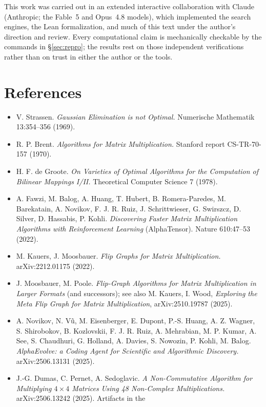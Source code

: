 \documentclass[10pt]{article}
\begin{document}
This work was carried out in an extended interactive collaboration
with Claude (Anthropic; the Fable~5 and Opus~4.8 models), which
implemented the search engines, the Lean formalization, and much of
this text under the author's direction and review. Every
computational claim is mechanically checkable by the commands in
\S\ref{sec:repro}; the results rest on those independent
verifications rather than on trust in either the author or the tools.

\section*{References}

\begin{itemize}
\item V. Strassen. \emph{Gaussian Elimination is not Optimal.}
  Numerische Mathematik 13:354--356 (1969).
\item R. P. Brent. \emph{Algorithms for Matrix Multiplication.}
  Stanford report CS-TR-70-157 (1970).
\item H. F. de Groote. \emph{On Varieties of Optimal Algorithms for
  the Computation of Bilinear Mappings I/II.} Theoretical Computer
  Science 7 (1978).
\item A. Fawzi, M. Balog, A. Huang, T. Hubert, B. Romera-Paredes,
  M. Barekatain, A. Novikov, F. J. R. Ruiz, J. Schrittwieser,
  G. Swirszcz, D. Silver, D. Hassabis, P. Kohli. \emph{Discovering
  Faster Matrix Multiplication Algorithms with Reinforcement
  Learning} (AlphaTensor). Nature 610:47--53 (2022).
\item M. Kauers, J. Moosbauer. \emph{Flip Graphs for Matrix
  Multiplication.} arXiv:2212.01175 (2022).
\item J. Moosbauer, M. Poole. \emph{Flip-Graph Algorithms for Matrix
  Multiplication in Larger Formats} (and successors); see also
  M. Kauers, I. Wood, \emph{Exploring the Meta Flip Graph for Matrix
  Multiplication}, arXiv:2510.19787 (2025).
\item A. Novikov, N. V\~u, M. Eisenberger, E. Dupont, P.-S. Huang,
  A. Z. Wagner, S. Shirobokov, B. Kozlovskii, F. J. R. Ruiz,
  A. Mehrabian, M. P. Kumar, A. See, S. Chaudhuri, G. Holland,
  A. Davies, S. Nowozin, P. Kohli, M. Balog. \emph{AlphaEvolve: a
  Coding Agent for Scientific and Algorithmic Discovery.}
  arXiv:2506.13131 (2025).
\item J.-G. Dumas, C. Pernet, A. Sedoglavic. \emph{A Non-Commutative
  Algorithm for Multiplying $4\times4$ Matrices Using 48 Non-Complex
  Multiplications.} arXiv:2506.13242 (2025). Artifacts in the

\end{itemize}
\end{document}
